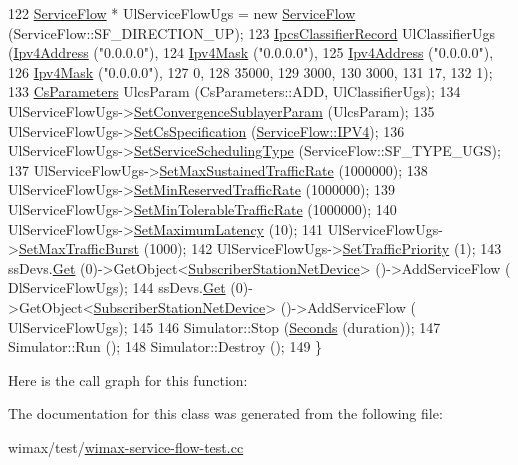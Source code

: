 \begin{DoxyCode}
122   \hyperlink{classns3_1_1ServiceFlow}{ServiceFlow} * UlServiceFlowUgs = \textcolor{keyword}{new} \hyperlink{classns3_1_1ServiceFlow}{ServiceFlow} (ServiceFlow::SF\_DIRECTION\_UP);
123   \hyperlink{classns3_1_1IpcsClassifierRecord}{IpcsClassifierRecord} UlClassifierUgs (\hyperlink{classns3_1_1Ipv4Address}{Ipv4Address} (\textcolor{stringliteral}{"0.0.0.0"}),
124                                         \hyperlink{classns3_1_1Ipv4Mask}{Ipv4Mask} (\textcolor{stringliteral}{"0.0.0.0"}),
125                                         \hyperlink{classns3_1_1Ipv4Address}{Ipv4Address} (\textcolor{stringliteral}{"0.0.0.0"}),
126                                         \hyperlink{classns3_1_1Ipv4Mask}{Ipv4Mask} (\textcolor{stringliteral}{"0.0.0.0"}),
127                                         0,
128                                         35000,
129                                         3000,
130                                         3000,
131                                         17,
132                                         1);
133   \hyperlink{classns3_1_1CsParameters}{CsParameters} UlcsParam (CsParameters::ADD, UlClassifierUgs);
134   UlServiceFlowUgs->\hyperlink{classns3_1_1ServiceFlow_a81a801e05aac9e7d1cfad3304e1b9d97}{SetConvergenceSublayerParam} (UlcsParam);
135   UlServiceFlowUgs->\hyperlink{classns3_1_1ServiceFlow_a72779cfbd71284ba06f10843ec0725b9}{SetCsSpecification} (\hyperlink{namespacens3_a79988e6e8b09f64c6ffca894994cb033af56451cc069a62c29e3d7577328b5027}{ServiceFlow::IPV4});
136   UlServiceFlowUgs->\hyperlink{classns3_1_1ServiceFlow_acdef049af2eda0d1ac80047208ce7571}{SetServiceSchedulingType} (ServiceFlow::SF\_TYPE\_UGS);
137   UlServiceFlowUgs->\hyperlink{classns3_1_1ServiceFlow_aef578837096b1a316696a88ecd550e7c}{SetMaxSustainedTrafficRate} (1000000);
138   UlServiceFlowUgs->\hyperlink{classns3_1_1ServiceFlow_ad49e9a793508d2d476de1e08897ecbf6}{SetMinReservedTrafficRate} (1000000);
139   UlServiceFlowUgs->\hyperlink{classns3_1_1ServiceFlow_aafc2368b8dab5d394635fa9f7fe281af}{SetMinTolerableTrafficRate} (1000000);
140   UlServiceFlowUgs->\hyperlink{classns3_1_1ServiceFlow_a61781dc767b833dfc34ed86e9efbc62d}{SetMaximumLatency} (10);
141   UlServiceFlowUgs->\hyperlink{classns3_1_1ServiceFlow_a586065681c386771f441a51f469fab03}{SetMaxTrafficBurst} (1000);
142   UlServiceFlowUgs->\hyperlink{classns3_1_1ServiceFlow_a9fd37b11439e3b6ca601c76e54d6273c}{SetTrafficPriority} (1);
143   ssDevs.\hyperlink{classns3_1_1NetDeviceContainer_a677d62594b5c9d2dea155cc5045f4d0b}{Get} (0)->GetObject<\hyperlink{classns3_1_1SubscriberStationNetDevice}{SubscriberStationNetDevice}> ()->AddServiceFlow (
      DlServiceFlowUgs);
144   ssDevs.\hyperlink{classns3_1_1NetDeviceContainer_a677d62594b5c9d2dea155cc5045f4d0b}{Get} (0)->GetObject<\hyperlink{classns3_1_1SubscriberStationNetDevice}{SubscriberStationNetDevice}> ()->AddServiceFlow (
      UlServiceFlowUgs);
145 
146   Simulator::Stop (\hyperlink{group__timecivil_ga33c34b816f8ff6628e33d5c8e9713b9e}{Seconds} (duration));
147   Simulator::Run ();
148   Simulator::Destroy ();
149 \}
\end{DoxyCode}


Here is the call graph for this function\+:




The documentation for this class was generated from the following file\+:\begin{DoxyCompactItemize}
\item 
wimax/test/\hyperlink{wimax-service-flow-test_8cc}{wimax-\/service-\/flow-\/test.\+cc}\end{DoxyCompactItemize}
